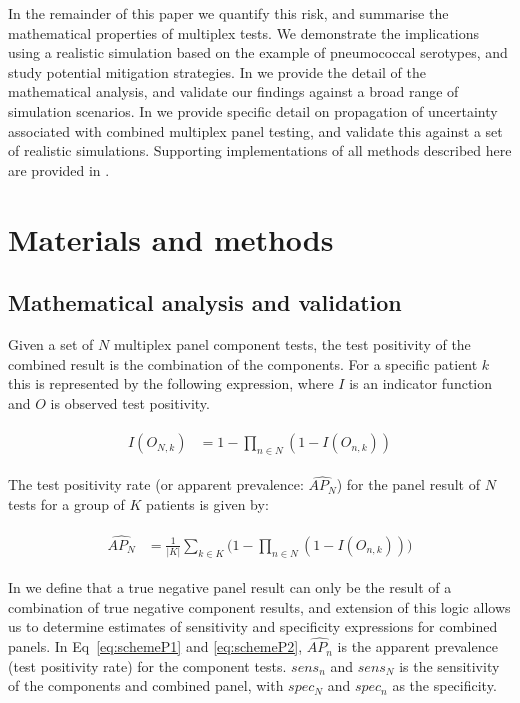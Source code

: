 \documentclass[10pt,letterpaper]{article}
\begin{document}
In the remainder of this paper we quantify this risk, and summarise the mathematical properties of multiplex tests. We demonstrate the implications using a realistic simulation based on the example of pneumococcal serotypes, and study potential mitigation strategies. In  we provide the detail of the mathematical analysis, and validate our findings against a broad range of simulation scenarios. In  we provide specific detail on propagation of uncertainty associated with combined multiplex panel testing, and validate this against a set of realistic simulations. Supporting implementations of all methods described here are provided in .

\section*{Materials and methods}

\subsection*{Mathematical analysis and validation}

Given a set of \(N\) multiplex panel component tests, the test positivity of the combined result is the combination of the components. For a specific patient \(k\) this is represented by the following expression, where \(I\) is an indicator function and \(O\) is observed test positivity.

\begin{eqnarray}
\begin{aligned}
I(O_{N,k}) &= 1-\prod_{n \in N}{(1-I(O_{n,k}))}
\end{aligned}
\end{eqnarray}

The test positivity rate (or apparent prevalence: \(\widehat{AP_N}\)) for the panel result of \(N\) tests for a group of \(K\) patients is given by:

\begin{eqnarray}
\begin{aligned}
\widehat{AP_N} &= \frac{1}{|K|}\sum_{k \in K}{\bigg(1-\prod_{n \in N}{(1-I(O_{n,k}))}\bigg)}
\end{aligned}
\end{eqnarray}

In  we define that a true negative panel result can only be the result of a combination of true negative component results, and extension of this logic allows us to determine estimates of sensitivity and specificity expressions for combined panels. In Eq~\ref{eq:schemeP1} and \ref{eq:schemeP2}, \(\widehat{AP_n}\)  is the apparent prevalence (test positivity rate) for the component tests. \(sens_n\) and \(sens_N\) is the sensitivity of the components and combined panel, with \(spec_N\) and \(spec_n\) as the specificity.
\end{document}
